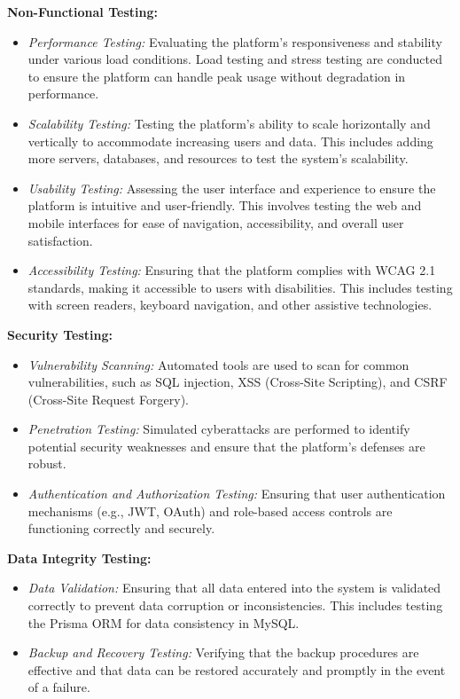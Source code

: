 \documentclass[12pt]{report}
\begin{document}
\textbf{Non-Functional Testing:}
\begin{itemize}
    \item \textit{Performance Testing:} Evaluating the platform's responsiveness and stability under various load conditions. Load testing and stress testing are conducted to ensure the platform can handle peak usage without degradation in performance.
    \item \textit{Scalability Testing:} Testing the platform's ability to scale horizontally and vertically to accommodate increasing users and data. This includes adding more servers, databases, and resources to test the system's scalability.
    \item \textit{Usability Testing:} Assessing the user interface and experience to ensure the platform is intuitive and user-friendly. This involves testing the web and mobile interfaces for ease of navigation, accessibility, and overall user satisfaction.
    \item \textit{Accessibility Testing:} Ensuring that the platform complies with WCAG 2.1 standards, making it accessible to users with disabilities. This includes testing with screen readers, keyboard navigation, and other assistive technologies.
\end{itemize}

\textbf{Security Testing:}
\begin{itemize}
    \item \textit{Vulnerability Scanning:} Automated tools are used to scan for common vulnerabilities, such as SQL injection, XSS (Cross-Site Scripting), and CSRF (Cross-Site Request Forgery).
    \item \textit{Penetration Testing:} Simulated cyberattacks are performed to identify potential security weaknesses and ensure that the platform's defenses are robust.
    \item \textit{Authentication and Authorization Testing:} Ensuring that user authentication mechanisms (e.g., JWT, OAuth) and role-based access controls are functioning correctly and securely.
\end{itemize}

\textbf{Data Integrity Testing:}
\begin{itemize}
    \item \textit{Data Validation:} Ensuring that all data entered into the system is validated correctly to prevent data corruption or inconsistencies. This includes testing the Prisma ORM for data consistency in MySQL.
    \item \textit{Backup and Recovery Testing:} Verifying that the backup procedures are effective and that data can be restored accurately and promptly in the event of a failure.
\end{itemize}
\end{document}
